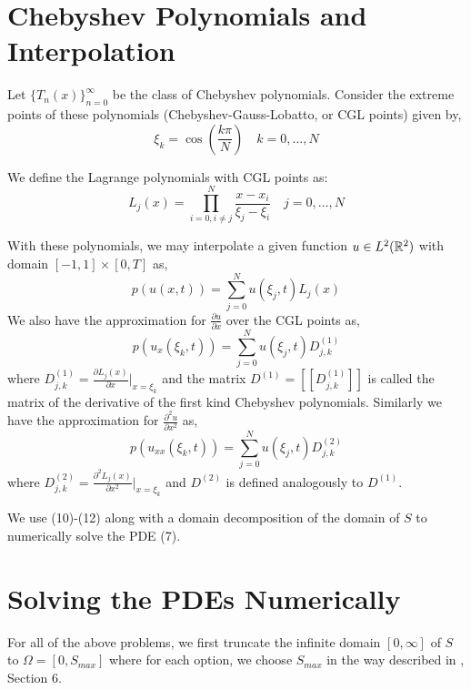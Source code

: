 \documentclass[a4paper,12pt]{article}
\begin{document}
\section{Chebyshev Polynomials and Interpolation}

Let $\{T_n(x)\}_{n=0}^\infty$ be the class of Chebyshev polynomials. Consider the extreme points of these polynomials (Chebyshev-Gauss-Lobatto, or CGL points) given by,
\begin{equation}
    \xi_k = \cos \left( \frac{k\pi}{N} \right) \quad k = 0, \dots, N
\end{equation}

We define the Lagrange polynomials with CGL points as:
\begin{equation}
    L_j(x) = \prod_{i=0, i \neq j}^N \frac{x - x_i}{\xi_j - \xi_i} \quad j = 0, \dots, N
\end{equation}

With these polynomials, we may interpolate a given function $u \in L^2(\mathbb{R}^2)$ with domain $[-1,1] \times [0,T]$ as,
\begin{equation}
    p(u(x,t)) = \sum_{j = 0}^N u(\xi_j , t) L_j(x)
\end{equation}
We also have the approximation for $\frac{\partial u}{\partial x}$ over the CGL points as,
\begin{equation}
    p(u_x(\xi_k,t)) = \sum_{j = 0}^N u(\xi_j , t) D_{j,k}^{(1)}
\end{equation}
where $D_{j,k}^{(1)} = \frac{\partial L_j(x)}{\partial x} |_{x = \xi_k}$ and the matrix $D^{(1)} = [[D_{j,k}^{(1)}]]$ is called the matrix of the derivative of the first kind Chebyshev polynomials. Similarly we have the approximation for $\frac{\partial^2 u}{\partial x^2}$ as,
\begin{equation}
    p(u_{xx}(\xi_k,t)) = \sum_{j = 0}^N u(\xi_j , t) D_{j,k}^{(2)}
\end{equation}
where $D_{j,k}^{(2)} = \frac{\partial^2 L_j(x)}{\partial x^2} |_{x = \xi_k}$ and $D^{(2)}$ is defined analogously to $D^{(1)}$.

We use (10)-(12) along with a domain decomposition of the domain of $S$ to numerically solve the PDE (7).

\section{Solving the PDEs Numerically}

For all of the above problems, we first truncate the infinite domain $[0, \infty]$ of $S$ to $\Omega = [0,S_{max}]$ where for each option, we choose $S_{max}$ in the way described in \cite{col}, Section 6.
\end{document}
